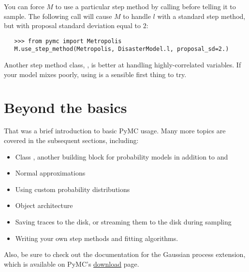 You can force $M$ to use a particular step method by calling  before telling it to sample. The following call will cause $M$ to handle $l$ with a standard  step method, but with proposal standard deviation equal to $2$:
\begin{verbatim}
   >>> from pymc import Metropolis
   M.use_step_method(Metropolis, DisasterModel.l, proposal_sd=2.)
\end{verbatim}

Another step method class, , is better at handling highly-correlated variables. If your model mixes poorly, using  is a sensible first thing to try.



\section{Beyond the basics}
That was a brief introduction to basic PyMC usage. Many more topics are covered in the subsequent sections, including:
\begin{itemize}
   \item Class , another building block for probability models in addition to  and 
   \item Normal approximations
   \item Using custom probability distributions
   \item Object architecture
   \item Saving traces to the disk, or streaming them to the disk during sampling
   \item Writing your own step methods and fitting algorithms.
\end{itemize}
Also, be sure to check out the documentation for the Gaussian process extension,
which is available on PyMC's
\href{http://code.google.com/p/pymc/downloads/list}{download} page.
